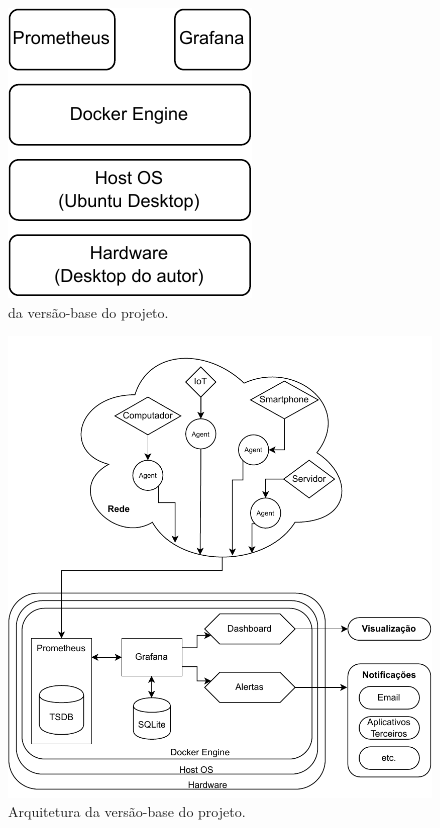 \begin{figure}[H]
\centering
\includegraphics[scale=1]{Imagens/chap03/v3_stack.pdf}
\caption{ da versão-base do projeto.}
\label{fig:StackBase}
\end{figure}
\begin{figure}[H]
\centering
\setlength{\abovecaptionskip}{-20pt}
\includegraphics[width=\textwidth]{Imagens/chap03/v3_diagram.pdf}
\caption{Arquitetura da versão-base do projeto.}
\label{fig:ArquiteturaBase}
\end{figure}

